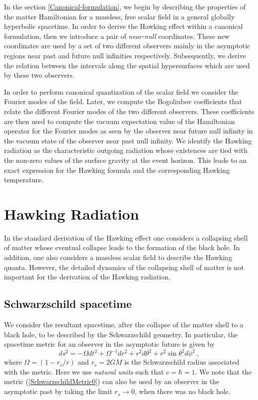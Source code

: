 \documentclass[aps,12pt,showpacs]{revtex4-2}
\def\rs{r_s}
\begin{document}
In the section \ref{Canonical-formulation}, we begin by describing the 
properties of the matter Hamiltonian for a massless, free scalar field in a 
general globally hyperbolic spacetime. In order to derive the Hawking effect 
within a canonical formulation, then we introduce a pair of \emph{near-null} 
coordinates. These new coordinates are used by a set of two different 
observers mainly in the asymptotic regions near past and future null infinities 
respectively. Subsequently, we derive the relation between the intervals along 
the spatial hypersurfaces which are used by these two observers. 



In order to perform canonical quantization of the scalar field we consider the 
Fourier modes of the field. Later, we compute the Bogoliubov coefficients that 
relate the different Fourier modes of the two different observers. These 
coefficients are then used to compute the vacuum expectation value of the 
Hamiltonian operator for the Fourier modes as seen by the observer near future 
null infinity in the vacuum state of the observer near past null infinity. We 
identify the Hawking radiation as the characteristic outgoing radiation whose 
existences are tied with the non-zero values of the surface gravity at the event 
horizon. This leads to an exact expression for the Hawking formula and the 
corresponding Hawking temperature.






\section{Hawking Radiation}\label{Hawking-radiation-review}

In the standard derivation of the Hawking effect \cite{hawking1975} one 
considers a collapsing shell of matter whose eventual collapse leads to the 
formation of the black hole. In addition, one also considers a massless scalar 
field to describe the Hawking quanta. However, the detailed dynamics of the 
collapsing shell of matter is not important for the derivation of the Hawking 
radiation.



\subsection{Schwarzschild spacetime}

We consider the resultant spacetime, after the collapse of the matter shell to 
a black hole, to be described by the Schwarzschild geometry. In particular, the 
spacetime metric for an observer in the asymptotic future is given by
%
\begin{equation}\label{SchwarzschildMetric0}
ds^2 = - \Omega dt^2 + \Omega^{-1} dr^2 
+ r^2 d\theta^2 + r^2 \sin\theta^2 d\phi^2 ~,
\end{equation}
%
where $\Omega = \left(1- r_s /r\right)$ and $r_s = 2 G M$ is the 
Schwarzschild radius associated with the metric. Here we use 
\emph{natural units} such that $c=\hbar=1$. We note that the metric 
(\ref{SchwarzschildMetric0}) can also be used by an observer in the asymptotic 
past by taking the limit $\rs\to0$, when there was no black hole.
\end{document}
